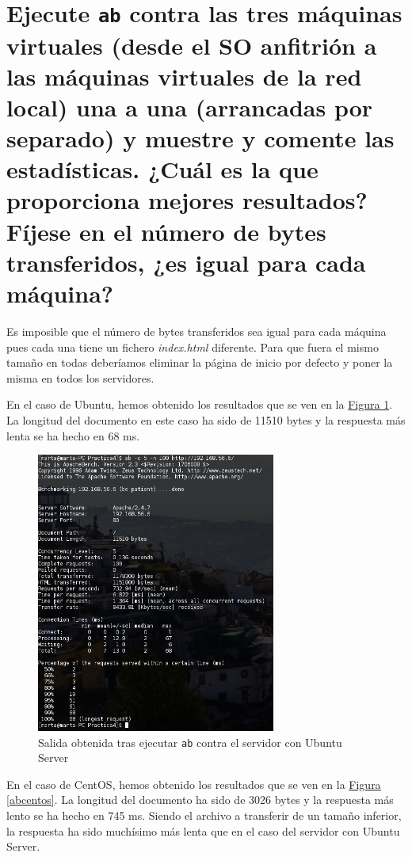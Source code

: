 \documentclass[10pt,a4paper,spanish]{article}
\numberwithin{equation}{section} %
\numberwithin{figure}{section} %
\numberwithin{table}{section} %
\begin{document}
\section{Ejecute \texttt{ab} contra las tres máquinas virtuales (desde el SO anfitrión a las máquinas virtuales de la red local) una a una (arrancadas por separado) y muestre y comente las estadísticas. ¿Cuál es la que proporciona mejores resultados? Fíjese en el número de bytes transferidos, ¿es igual para cada máquina?}

Es imposible que el número de bytes transferidos sea igual para cada máquina pues cada una tiene un fichero \textit{index.html} diferente. Para que fuera el mismo tamaño en todas deberíamos eliminar la página de inicio por defecto y poner la misma en todos los servidores.

En el caso de Ubuntu, hemos obtenido los resultados que se ven en la \hyperref[abubuntu]{Figura \ref*{abubuntu}}. La longitud del documento en este caso ha sido de 11510 bytes y la respuesta más lenta se ha hecho en 68 ms.

\begin{figure}[!h]
    \centering
    \includegraphics[width=0.7\textwidth]{6}
    \caption{Salida obtenida tras ejecutar \texttt{ab} contra el servidor con Ubuntu Server}
    \label{abubuntu}
\end{figure}

En el caso de CentOS, hemos obtenido los resultados que se ven en la \hyperref[abcentos]{Figura \ref*{abcentos}}. La longitud del documento ha sido de 3026 bytes y la respuesta más lento se ha hecho en 745 ms. Siendo el archivo a transferir de un tamaño inferior, la respuesta ha sido muchísimo más lenta que en el caso del servidor con Ubuntu Server.
\end{document}
